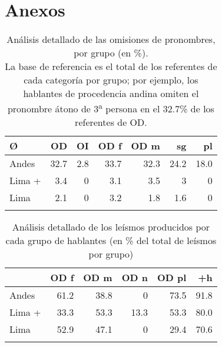 \documentclass[output=paper]{../langscibook}
\begin{document}
\section{Anexos}

\begin{table}
\caption{\label{tab:mick:3.1} Análisis detallado de las omisiones de pronombres, por grupo (en \%).\\La base de referencia es el total de los referentes de cada categoría por grupo; por ejemplo, los hablantes de procedencia andina omiten el pronombre átono de 3\textsuperscript{a} persona en el 32.7\% de los referentes de OD.}
\begin{tabularx}{\textwidth}{Xrrrrrr}
\lsptoprule
 Ø & \textbf{OD} & \textbf{OI} & \textbf{OD} \textbf{f} & \textbf{OD} \textbf{m} & \textbf{sg} & \textbf{pl}\\
 \midrule
 Andes & 32.7 & 2.8 & 33.7 & 32.3 & 24.2 & 18.0\\
 Lima + & 3.4 & 0 & 3.1 & 3.5 & 3 & 0\\
 Lima & 2.1 & 0 & 3.2 & 1.8 & 1.6 & 0\\
\lspbottomrule
\end{tabularx}
\end{table}

\begin{table}
\caption{\label{tab:mick:3.2} Análisis detallado de los leísmos producidos por cada grupo de hablantes (en \% del total de leísmos por grupo)}
\begin{tabularx}{\textwidth}{Xrrrrr}
\lsptoprule
& \textbf{OD} \textbf{f} & \textbf{OD} \textbf{m} & \textbf{OD} \textbf{n} & \textbf{OD} \textbf{pl} & \textbf{+h}\\
\midrule 
 Andes & 61.2 & 38.8 & 0 & 73.5 & 91.8\\
 Lima + & 33.3 & 53.3 & 13.3 & 53.3 & 80.0\\
 Lima & 52.9 & 47.1 & 0 & 29.4 & 70.6\\
\lspbottomrule
\end{tabularx}
\end{table}
\end{document}

